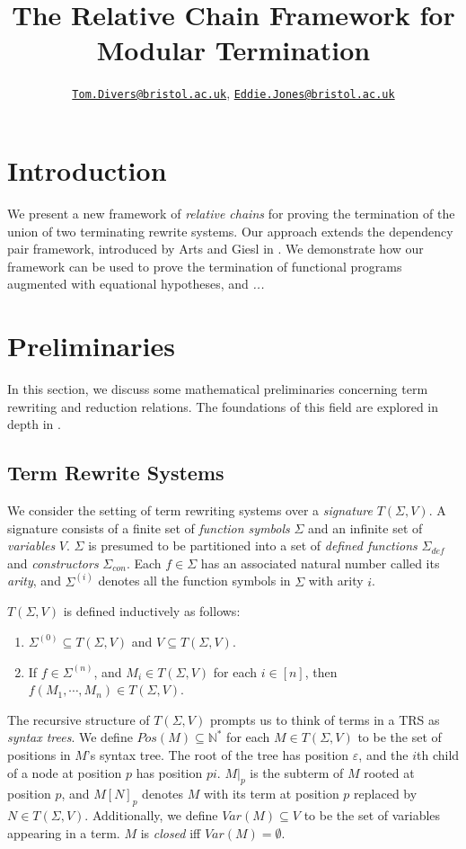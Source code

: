 \documentclass{article}
\title{The Relative Chain Framework for Modular Termination}
\author{\href{mailto:oi24939@bristol.ac.uk}{\texttt{Tom.Divers@bristol.ac.uk}}, \href{mailto:eddie.jones@bristol.ac.uk}{\texttt{Eddie.Jones@bristol.ac.uk}}}
\date{}
\theoremstyle{definition}
\begin{document}
\maketitle

\section{Introduction}

We present a new framework of \emph{relative chains} for proving the termination of the union of two terminating rewrite systems. Our approach extends the dependency pair framework, introduced by Arts and Giesl in \cite{arts2000dependency}. We demonstrate how our framework can be used to prove the termination of functional programs augmented with equational hypotheses, and \emph{...}

\section{Preliminaries}

In this section, we discuss some mathematical preliminaries concerning term rewriting and reduction relations. The foundations of this field are explored in depth in \cite{baader1998terms}.

\subsection{Term Rewrite Systems}

We consider the setting of term rewriting systems over a \emph{signature} $T(\Sigma, V)$. A signature consists of a finite set of \emph{function symbols} $\Sigma$ and an infinite set of \emph{variables} $V$. $\Sigma$ is presumed to be partitioned into a set of \emph{defined functions} $\Sigma_{def}$ and \emph{constructors} $\Sigma_{con}$. Each $f \in \Sigma$ has an associated natural number called its \emph{arity}, and $\Sigma^{(i)}$ denotes all the function symbols in $\Sigma$ with arity $i$.

$T(\Sigma, V)$ is defined inductively as follows: \begin{enumerate}
    \item $\Sigma^{(0)} \subseteq T(\Sigma, V)$ and $V \subseteq T(\Sigma, V)$. 
    \item If $f \in \Sigma^{(n)}$, and $M_i \in T(\Sigma, V)$ for each $i \in [n]$, then $f(M_1, \cdots, M_n) \in T(\Sigma, V)$. 
\end{enumerate}

The recursive structure of $T(\Sigma, V)$ prompts us to think of terms in a TRS as \emph{syntax trees}. We define $Pos(M) \subseteq \mathbb{N}^*$ for each $M \in T(\Sigma, V)$ to be the set of positions in $M$'s syntax tree. The root of the tree has position $\varepsilon$, and the $i$th child of a node at position $p$ has position $pi$. $M|_p$ is the subterm of $M$ rooted at position $p$, and $M[N]_p$ denotes $M$ with its term at position $p$ replaced by $N \in T(\Sigma, V)$. Additionally, we define $Var(M) \subseteq V$ to be the set of variables appearing in a term. $M$ is \emph{closed} iff $Var(M) = \emptyset$. 
\end{document}
